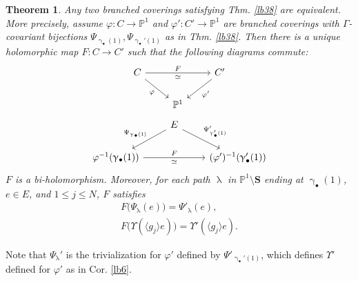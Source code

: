\documentclass[11pt,b5paper,notitlepage]{article}
\theoremstyle{definition}
\theoremstyle{plain}
\newtheorem{thm}[df]{Theorem}
\newcommand{\bk}[1]{\langle {#1}\rangle}
\newcommand{\blt}{\bullet}
\newcommand{\Pbb}{\mathbb P}
\newcommand{\Sbf}{\mathbf{S}}
\numberwithin{equation}{subsection}
\begin{document}
\begin{thm}\label{lb29}
Any two branched coverings satisfying Thm. \ref{lb38} are equivalent. More precisely, assume $\varphi:C\rightarrow\Pbb^1$ and $\varphi':C'\rightarrow\Pbb^1$ are branched coverings with $\Gamma$-covariant bijections $\Psi_{\upgamma_\blt(1)},\Psi_{\upgamma_\blt'(1)}$ as in Thm. \ref{lb38}. Then there is a unique holomorphic map $F:C\rightarrow C'$ such that  the following diagrams commute:
\begin{equation}\label{eq6}
\begin{tikzcd}
C \arrow[rr, "F","\simeq"'] \arrow[dr, "\varphi"'] && C' \arrow[dl, "\varphi'"] \\
&  \Pbb^1
\end{tikzcd}	
\end{equation}
\begin{equation}\label{eq68}
\begin{tikzcd}
&E \arrow[dl, "\Psi_{\upgamma_\blt(1)}"'] \arrow[dr,  "{\Psi'_{\upgamma_\blt'(1)}}"]\\
\varphi^{-1}(\upgamma_\blt(1))\arrow[rr, "F", "\simeq"'] && (\varphi')^{-1}(\upgamma_\blt'(1))
\end{tikzcd}
\end{equation}
$F$ is a bi-holomorphism. Moreover, for each path $\uplambda$ in $\Pbb^1\setminus\Sbf$ ending at $\upgamma_\blt(1)$, $e\in E$, and $1\leq j\leq N$, $F$ satisfies 
\begin{gather*}
F\big(\Psi_\uplambda(e)\big)=\Psi'_\uplambda(e),\\
F\big(\Upsilon(\bk{g_j}e)\big)=\Upsilon'(\bk{g_j}e).
\end{gather*}
\end{thm}

Note that $\Psi_\uplambda'$ is the trivialization for $\varphi'$ defined by $\Psi'_{\upgamma_\blt'(1)}$, which defines $\Upsilon'$  defined for $\varphi'$ as in Cor. \ref{lb6}.
\end{document}
